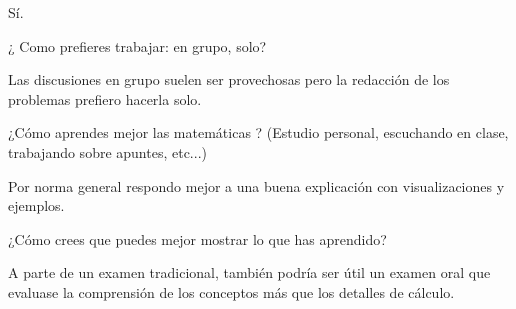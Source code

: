 \documentclass[]{exam}
\begin{document}
\begin{questions}
Sí.

\question ¿ Como prefieres trabajar: en grupo, solo?

Las discusiones en grupo suelen ser provechosas pero la redacción de los problemas
prefiero hacerla solo.

\question ¿Cómo aprendes mejor las matemáticas ? (Estudio personal, escuchando en clase,
trabajando sobre apuntes, etc...) 

Por norma general respondo mejor a una buena explicación con visualizaciones y ejemplos.

\question ¿Cómo crees que puedes mejor mostrar lo que has aprendido? 

A parte de un examen tradicional, también podría ser útil un examen oral que evaluase la
comprensión de los conceptos más que los detalles de cálculo.

\end{questions}
\end{document}
